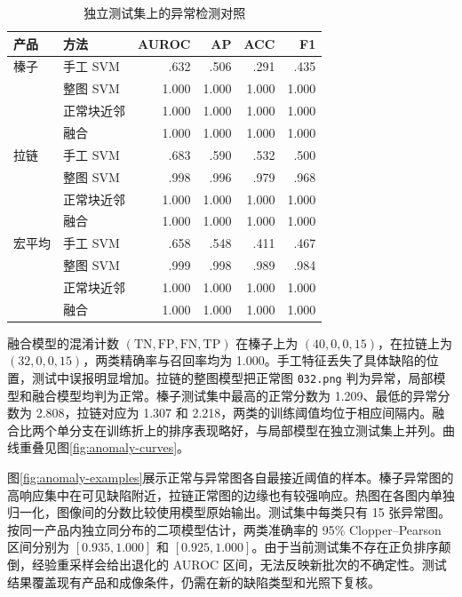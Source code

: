 \begin{table}[tbp]
 \caption{独立测试集上的异常检测对照}
 \label{tab:anomaly-results}
 \centering
 \begin{tabular}{@{}llrrrr@{}}
 \toprule
 产品 & 方法 & AUROC & AP & ACC & F1 \\
 \midrule
 榛子 & 手工 SVM & .632 & .506 & .291 & .435 \\
      & 整图 SVM & 1.000 & 1.000 & 1.000 & 1.000 \\
      & 正常块近邻 & 1.000 & 1.000 & 1.000 & 1.000 \\
      & 融合 & 1.000 & 1.000 & 1.000 & 1.000 \\
 \addlinespace
 拉链 & 手工 SVM & .683 & .590 & .532 & .500 \\
      & 整图 SVM & .998 & .996 & .979 & .968 \\
      & 正常块近邻 & 1.000 & 1.000 & 1.000 & 1.000 \\
      & 融合 & 1.000 & 1.000 & 1.000 & 1.000 \\
 \addlinespace
 宏平均 & 手工 SVM & .658 & .548 & .411 & .467 \\
      & 整图 SVM & .999 & .998 & .989 & .984 \\
      & 正常块近邻 & 1.000 & 1.000 & 1.000 & 1.000 \\
      & 融合 & 1.000 & 1.000 & 1.000 & 1.000 \\
 \bottomrule
 \end{tabular}
\end{table}

融合模型的混淆计数 $(\mathrm{TN},\mathrm{FP},\mathrm{FN},\mathrm{TP})$ 在榛子上为 $(40,0,0,15)$，在拉链上为 $(32,0,0,15)$，两类精确率与召回率均为 1.000。手工特征丢失了具体缺陷的位置，测试中误报明显增加。拉链的整图模型把正常图 \texttt{032.png} 判为异常，局部模型和融合模型均判为正常。榛子测试集中最高的正常分数为 1.209、最低的异常分数为 2.808，拉链对应为 1.307 和 2.218，两类的训练阈值均位于相应间隔内。融合比两个单分支在训练折上的排序表现略好，与局部模型在独立测试集上并列。曲线重叠见图\ref{fig:anomaly-curves}。

图\ref{fig:anomaly-examples}展示正常与异常图各自最接近阈值的样本。榛子异常图的高响应集中在可见缺陷附近，拉链正常图的边缘也有较强响应。热图在各图内单独归一化，图像间的分数比较使用模型原始输出。测试集中每类只有 15 张异常图。按同一产品内独立同分布的二项模型估计，两类准确率的 95\% Clopper--Pearson 区间分别为 $[0.935,1.000]$ 和 $[0.925,1.000]$。由于当前测试集不存在正负排序颠倒，经验重采样会给出退化的 AUROC 区间，无法反映新批次的不确定性。测试结果覆盖现有产品和成像条件，仍需在新的缺陷类型和光照下复核。

